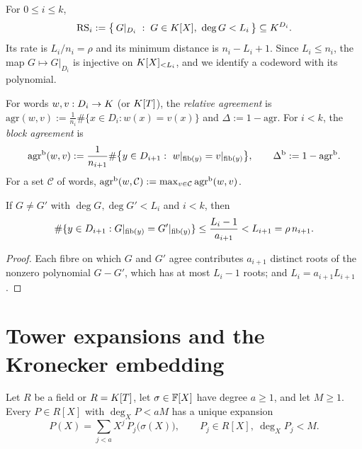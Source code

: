 \begin{definition}\label{def:rs}
For $0\le i\le k$,
\[
\RS_i:=\bigl\{\,G|_{D_i}\;:\;G\in\K[X],\ \deg G<L_i\,\bigr\}\subseteq \K^{D_i}.
\]
Its rate is $L_i/n_i=\rho$ and its minimum distance is $n_i-L_i+1$. Since $L_i\le n_i$,
the map $G\mapsto G|_{D_i}$ is injective on $K[X]_{<L_i}$, and we identify a codeword with
its polynomial.
\end{definition}

\begin{definition}\label{def:agreement}
For words $w,v:D_i\to K$ (or $K[T]$), the \emph{relative agreement} is
$\mathrm{agr}(w,v):=\frac1{n_i}\#\{x\in D_i: w(x)=v(x)\}$ and $\Delta:=1-\mathrm{agr}$.
For $i<k$, the \emph{block agreement} is
\[
\agr(w,v):=\frac1{n_{i+1}}\#\bigl\{y\in D_{i+1}:\ w|_{\fib(y)}=v|_{\fib(y)}\bigr\},
\qquad \Db:=1-\agr .
\]
For a set $\mathcal C$ of words, $\mathrm{agr}^{\mathrm{b}}(w,\mathcal C):=\max_{v\in\mathcal C}\mathrm{agr}^{\mathrm{b}}(w,v)$.
\end{definition}

\begin{lemma}\label{lem:codeword-fibres}
If $G\neq G'$ with $\deg G,\deg G'<L_i$ and $i<k$, then
\[
\#\{y\in D_{i+1}: G|_{\mathrm{fib}(y)}=G'|_{\mathrm{fib}(y)}\}\le \frac{L_i-1}{a_{i+1}}<L_{i+1}=\rho\,n_{i+1}.
\]
\end{lemma}

\begin{proof}
Each fibre on which $G$ and $G'$ agree contributes $a_{i+1}$ distinct roots of the nonzero
polynomial $G-G'$, which has at most $L_i-1$ roots; and $L_i=a_{i+1}L_{i+1}$.
\end{proof}

\section{Tower expansions and the Kronecker embedding}

\begin{lemma}\label{lem:sigma-adic}
Let $R$ be a field or $R=K[T]$, let $\sigma\in\mathbb{F}[X]$ have degree $a\ge1$, and let $M\ge1$.
Every $P\in R[X]$ with $\deg_XP<aM$ has a unique expansion
\[
P(X)=\sum_{j<a}X^j\,P_j\bigl(\sigma(X)\bigr),\qquad P_j\in R[X],\ \deg_XP_j<M .
\]
\end{lemma}

